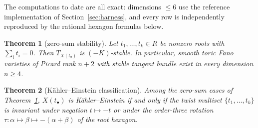 \documentclass[11pt]{amsart}
\newtheorem{theorem}{Theorem}[section]
\theoremstyle{definition}
\theoremstyle{remark}
\begin{document}
The computations to date are all exact: dimensions $\le 6$ use the reference
implementation of Section~\ref{sec:harness}, and every row is independently
reproduced by the rational hexagon formulas below.

\begin{center}
\end{center}

\begin{theorem}[zero-sum stability]\label{thm:zerosum}
Let $t_1,\dots,t_k\in R$ be nonzero roots with $\sum_i t_i=0$. Then
$T_{X(t_\bullet)}$ is $(-K)$-stable. In particular, smooth toric Fano
varieties of Picard rank $n+2$ with stable
tangent bundle exist in every dimension $n\ge4$.
\end{theorem}

\begin{theorem}[K\"ahler--Einstein classification]\label{thm:roottwist-ke}
Among the zero-sum cases of Theorem~\ref{thm:zerosum},
$X(t_\bullet)$ is K\"ahler--Einstein if and only if the
twist multiset $\{t_1, \dots, t_k\}$ is invariant under negation
$t \mapsto -t$ or under the order-three rotation
$\tau\colon \alpha \mapsto \beta \mapsto -(\alpha+\beta)$ of the root hexagon.
\end{theorem}
\end{document}
